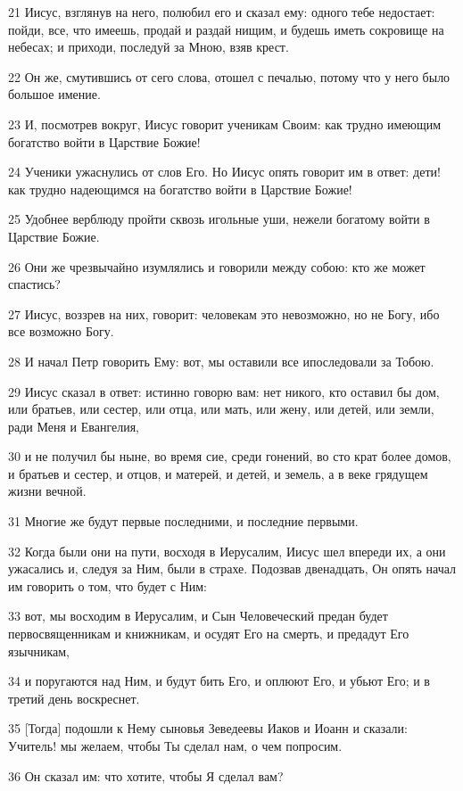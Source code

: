 \par 21 Иисус, взглянув на него, полюбил его и сказал ему: одного тебе недостает: пойди, все, что имеешь, продай и раздай нищим, и будешь иметь сокровище на небесах; и приходи, последуй за Мною, взяв крест.
\par 22 Он же, смутившись от сего слова, отошел с печалью, потому что у него было большое имение.
\par 23 И, посмотрев вокруг, Иисус говорит ученикам Своим: как трудно имеющим богатство войти в Царствие Божие!
\par 24 Ученики ужаснулись от слов Его. Но Иисус опять говорит им в ответ: дети! как трудно надеющимся на богатство войти в Царствие Божие!
\par 25 Удобнее верблюду пройти сквозь игольные уши, нежели богатому войти в Царствие Божие.
\par 26 Они же чрезвычайно изумлялись и говорили между собою: кто же может спастись?
\par 27 Иисус, воззрев на них, говорит: человекам это невозможно, но не Богу, ибо все возможно Богу.
\par 28 И начал Петр говорить Ему: вот, мы оставили все ипоследовали за Тобою.
\par 29 Иисус сказал в ответ: истинно говорю вам: нет никого, кто оставил бы дом, или братьев, или сестер, или отца, или мать, или жену, или детей, или земли, ради Меня и Евангелия,
\par 30 и не получил бы ныне, во время сие, среди гонений, во сто крат более домов, и братьев и сестер, и отцов, и матерей, и детей, и земель, а в веке грядущем жизни вечной.
\par 31 Многие же будут первые последними, и последние первыми.
\par 32 Когда были они на пути, восходя в Иерусалим, Иисус шел впереди их, а они ужасались и, следуя за Ним, были в страхе. Подозвав двенадцать, Он опять начал им говорить о том, что будет с Ним:
\par 33 вот, мы восходим в Иерусалим, и Сын Человеческий предан будет первосвященникам и книжникам, и осудят Его на смерть, и предадут Его язычникам,
\par 34 и поругаются над Ним, и будут бить Его, и оплюют Его, и убьют Его; и в третий день воскреснет.
\par 35 [Тогда] подошли к Нему сыновья Зеведеевы Иаков и Иоанн и сказали: Учитель! мы желаем, чтобы Ты сделал нам, о чем попросим.
\par 36 Он сказал им: что хотите, чтобы Я сделал вам?
